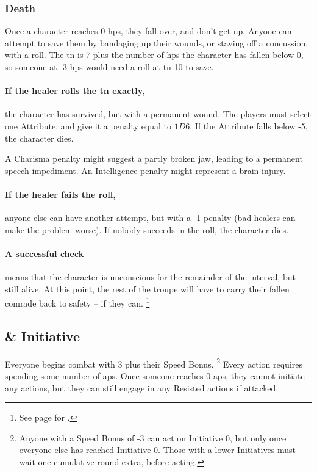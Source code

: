 \begin{multicols}{2}
\subsubsection{Death}
\label{death}
Once a character reaches 0 \glspl{hp}, they fall over, and don't get up.
Anyone can attempt to save them by bandaging up their wounds, or staving off a concussion, with a  roll.
The \gls{tn} is 7 plus the number of \glspl{hp} the character has fallen below 0, so someone at -3 \glspl{hp} would need a roll at \gls{tn} 10 to save.

\paragraph{If the healer rolls the \gls{tn} exactly,}
the character has survived, but with a permanent wound.
The players must select one Attribute, and give it a penalty equal to $1D6$.
If the Attribute falls below -5, the character dies.

A Charisma penalty might suggest a partly broken jaw, leading to a permanent speech impediment.
An Intelligence penalty might represent a brain-injury.

\paragraph{If the healer fails the roll,}
anyone else can have another attempt, but with a -1 penalty (bad healers can make the problem worse).
If nobody succeeds in the roll, the character dies.

\paragraph{A successful check}
means that the character is unconscious for the remainder of the interval, but still alive.
At this point, the rest of the troupe will have to carry their fallen comrade back to safety -- if they can.%
\footnote{See page \pageref{weight} for .}

\subsection{ \& Initiative}
\label{actionPoints}

Everyone begins combat with 3  plus their Speed Bonus.%
\footnote{Anyone with a Speed Bonus of -3 can act on Initiative 0, but only once everyone else has reached Initiative 0.
Those with a lower Initiatives must wait one cumulative round extra, before acting.}
Every action requires spending some number of \glspl{ap}.
Once someone reaches 0 \glspl{ap}, they cannot initiate any actions, but they can still engage in any Resisted actions if attacked.


\end{multicols}
